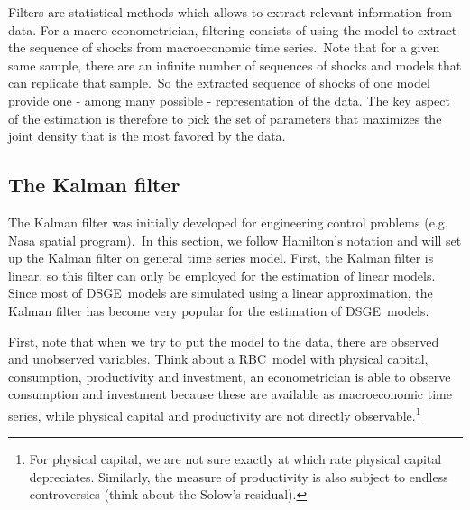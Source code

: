\documentclass[a4paper,12pt]{article}%
\begin{document}
Filters are statistical methods which allows to extract relevant information
from data. For a macro-econometrician, filtering consists of using the model
to extract the sequence of shocks from macroeconomic time series.\ Note that
for a given same sample, there are an infinite number of sequences of shocks
and models that can replicate that sample.\ So the extracted sequence of
shocks of one model provide one - among many possible - representation of the
data. The key aspect of the estimation is therefore to pick the set of
parameters that maximizes the joint density that is the most favored by the data.

\subsection{The Kalman filter}

The Kalman filter was initially developed for engineering control problems
(e.g. Nasa spatial program).\ In this section, we follow Hamilton's notation
and will set up the Kalman filter on general time series model. First, the
Kalman filter is linear, so this filter can only be employed for the
estimation of linear models. Since most of DSGE\ models are simulated using a
linear approximation, the Kalman filter has become very popular for the estimation of DSGE\ models.

First, note that when we try to put the model to the data, there are observed
and unobserved variables. Think about a RBC\ model with physical capital,
consumption, productivity and investment, an econometrician is able to observe
consumption and investment because these are available as macroeconomic time
series, while physical capital and productivity are not directly
observable.\footnote{For physical capital, we are not sure exactly at which
rate physical capital depreciates. Similarly, the measure of productivity is
also subject to endless controversies (think about the Solow's residual).}
\end{document}

